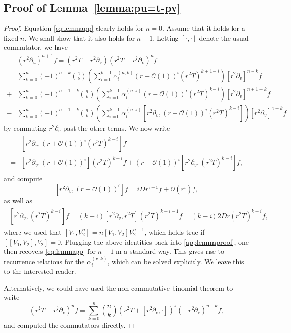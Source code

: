 \documentclass[11pt,english]{article}
\numberwithin{equation}{section}
\theoremstyle{remark}
\theoremstyle{plain}
\newenvironment{nalign}{
    \begin{equation}
    \begin{aligned}
}{
    \end{aligned}
    \end{equation}
    \ignorespacesafterend
}
\theoremstyle{remark}
\newcommand{\pu}{\partial_u}
\newcommand{\pv}{\partial_v}
\renewcommand{\(}{\left(}
\renewcommand{\)}{\right)}
\begin{document}
\subsection{Proof of Lemma~\ref{lemma:pu=t-pv}}\label{A2}
\begin{proof}
Equation \eqref{eq:lemmapp} clearly holds for $n=0$. Assume that it holds for a fixed $n$. We shall show that it also holds for $n+1$. Letting $[\cdot,\cdot]$ denote the usual commutator, we have
\begin{nalign}\label{applemmaproof}
&(r^2\pu)^{n+1} f=(r^2T-r^2\pv)(r^2T-r^2\pv)^nf\\
=&\sum_{k=0}^n (-1)^{n-k}\binom{n}{k}\left(\sum_{i=0}^{k-1}\alpha^{(n,k)}_i(r+\mathcal{O}(1))^i(r^2 T)^{k+1-i}\right)[r^2\pv]^{n-k}f\\
+&\sum_{k=0}^n (-1)^{n+1-k}\binom{n}{k}\left(\sum_{i=0}^{k-1}\alpha^{(n,k)}_i(r+\mathcal{O}(1))^i(r^2 T)^{k-i}\right)[r^2\pv]^{n+1-k}f\\
-&\sum_{k=0}^n (-1)^{n+1-k}\binom{n}{k}\left(\sum_{i=0}^{k-1}\alpha^{(n,k)}_i\left[r^2\pv,(r+\mathcal{O}(1))^i(r^2 T)^{k-i}\right]\right)[r^2\pv]^{n-k}f
\end{nalign}
by commuting $r^2\pv$ past the other terms.
We now write
\begin{align}
\begin{split}
&\left[r^2\pv,(r+\mathcal{O}(1))^i(r^2 T)^{k-i}\right]f\\
=&\left[r^2\pv,(r+\mathcal{O}(1))^i\right](r^2 T)^{k-i}f+(r+\mathcal{O}(1))^i\left[r^2\pv,(r^2 T)^{k-i}\right]f,
\end{split}
\end{align}
and compute
\begin{equation}
\left[r^2\pv,(r+\mathcal{O}(1))^i\right]f=iD r^{i+1}f+\mathcal{O}(r^i)f,
\end{equation}
as well as
\begin{align}
\begin{split}
\left[r^2\pv,(r^2 T)^{k-i}\right]f=(k-i)\left[r^2\pv,r^2 T\right](r^2T)^{k-i-1}f
=(k-i)2Dr (r^2T)^{k-i} f,
\end{split}
\end{align}
where we used that $[V_1,V_2^n]=n[V_1,V_2]V_2^{n-1}$, which holds true if $[[V_1,V_2],V_2]=0$. Plugging the above identities back into \eqref{applemmaproof}, one then recovers \eqref{eq:lemmapp} for $n+1$ in a standard way. This gives rise to recurrence relations for the $\alpha_i^{(n,k)}$,  which can be solved explicitly. We leave this to the interested reader.

Alternatively, we could have used the non-commutative binomial theorem to write
\begin{equation}
(r^2T-r^2\pv)^n f=\sum_{k=0}^n\binom{n}{k}\left(r^2T+[r^2\pv, \cdot]\right)^k(-r^2\pv)^{n-k} f,
\end{equation}
and computed the commutators directly.
\end{proof}
\end{document}
